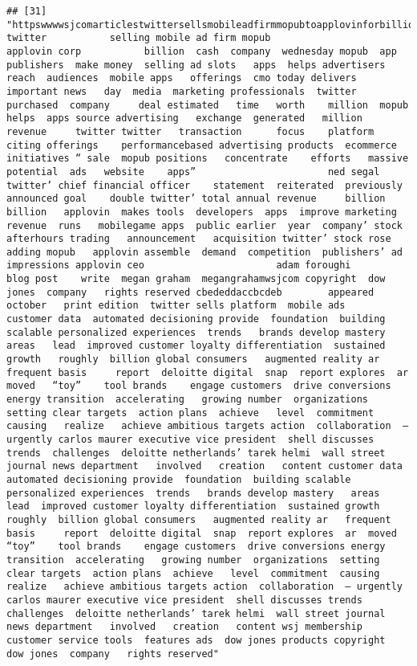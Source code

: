 \documentclass[
]{article}
\begin{document}
\begin{verbatim}
## [31] "httpswwwwsjcomarticlestwittersellsmobileadfirmmopubtoapplovinforbillion                    twitter           selling mobile ad firm mopub                    applovin corp           billion  cash  company  wednesday mopub  app publishers  make money  selling ad slots   apps  helps advertisers reach  audiences  mobile apps   offerings  cmo today delivers   important news   day  media  marketing professionals  twitter purchased  company     deal estimated   time   worth    million  mopub    helps  apps source advertising   exchange  generated   million  revenue     twitter twitter   transaction      focus    platform citing offerings    performancebased advertising products  ecommerce initiatives “ sale  mopub positions   concentrate    efforts   massive potential  ads   website    apps”                       ned segal          twitter’ chief financial officer    statement  reiterated  previously announced goal    double twitter’ total annual revenue     billion     billion   applovin  makes tools  developers  apps  improve marketing  revenue  runs   mobilegame apps  public earlier  year  company’ stock       afterhours trading   announcement   acquisition twitter’ stock rose   adding mopub   applovin assemble  demand  competition  publishers’ ad impressions applovin ceo                       adam foroughi             blog post    write  megan graham  megangrahamwsjcom copyright  dow jones  company   rights reserved cbededdaccbcdeb        appeared   october   print edition  twitter sells platform  mobile ads      customer data  automated decisioning provide  foundation  building scalable personalized experiences  trends   brands develop mastery   areas   lead  improved customer loyalty differentiation  sustained growth   roughly  billion global consumers   augmented reality ar   frequent basis     report  deloitte digital  snap  report explores  ar  moved   “toy”    tool brands    engage customers  drive conversions energy transition  accelerating   growing number  organizations  setting clear targets  action plans  achieve   level  commitment  causing   realize   achieve ambitious targets action  collaboration  — urgently carlos maurer executive vice president  shell discusses trends  challenges  deloitte netherlands’ tarek helmi  wall street journal news department   involved   creation   content customer data  automated decisioning provide  foundation  building scalable personalized experiences  trends   brands develop mastery   areas   lead  improved customer loyalty differentiation  sustained growth   roughly  billion global consumers   augmented reality ar   frequent basis     report  deloitte digital  snap  report explores  ar  moved   “toy”    tool brands    engage customers  drive conversions energy transition  accelerating   growing number  organizations  setting clear targets  action plans  achieve   level  commitment  causing   realize   achieve ambitious targets action  collaboration  — urgently carlos maurer executive vice president  shell discusses trends  challenges  deloitte netherlands’ tarek helmi  wall street journal news department   involved   creation   content wsj membership customer service tools  features ads  dow jones products copyright   dow jones  company   rights reserved"                                                   
\end{verbatim}
\end{document}
